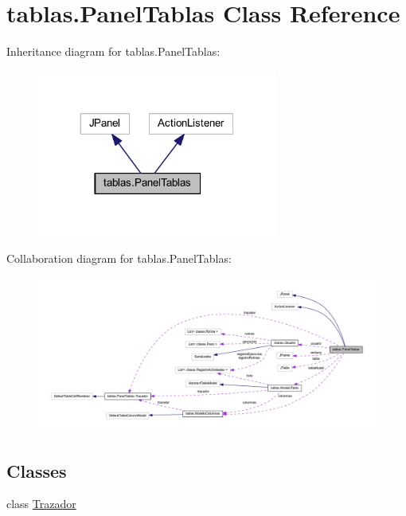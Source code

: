\hypertarget{classtablas_1_1_panel_tablas}{}\section{tablas.\+Panel\+Tablas Class Reference}
\label{classtablas_1_1_panel_tablas}


Inheritance diagram for tablas.\+Panel\+Tablas\+:
\nopagebreak
\begin{figure}[H]
\begin{center}
\leavevmode
\includegraphics[width=224pt]{classtablas_1_1_panel_tablas__inherit__graph}
\end{center}
\end{figure}


Collaboration diagram for tablas.\+Panel\+Tablas\+:
\nopagebreak
\begin{figure}[H]
\begin{center}
\leavevmode
\includegraphics[width=350pt]{classtablas_1_1_panel_tablas__coll__graph}
\end{center}
\end{figure}
\subsection*{Classes}
\begin{DoxyCompactItemize}
\item 
class \mbox{\hyperlink{classtablas_1_1_panel_tablas_1_1_trazador}{Trazador}}
\end{DoxyCompactItemize}
